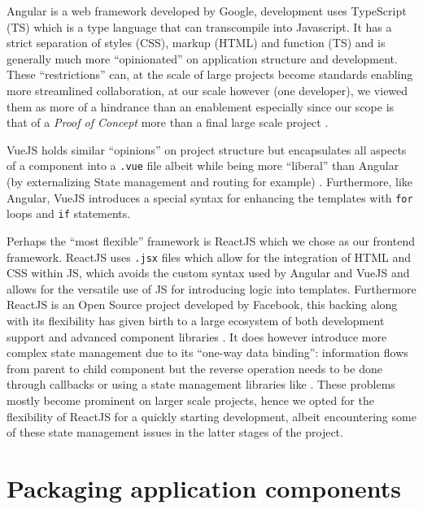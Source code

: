 \documentclass[\version]{l4proj}
\begin{document}
Angular is a web framework developed by Google, development uses TypeScript (TS) which is a type language that can transcompile into Javascript.
It has a strict separation of styles (CSS), markup (HTML) and function (TS) and is generally much more ``opinionated'' on application structure and development.
These ``restrictions'' can, at the scale of large projects become standards enabling more streamlined collaboration, at our scale however (one developer), we viewed them as more of a hindrance than an enablement especially since our scope is that of a \textit{Proof of Concept} more than a final large scale project \autocite{wohlgethanSupportingWebDevelopmentDecisions2018}.

VueJS holds similar ``opinions'' on project structure but encapsulates all aspects of a component into a \lstinline{.vue} file albeit while being more ``liberal'' than Angular (by externalizing State management and routing for example) \autocite{wohlgethanSupportingWebDevelopmentDecisions2018}.
Furthermore, like Angular, VueJS introduces a special syntax for enhancing the templates with \lstinline{for} loops and \lstinline{if} statements.

Perhaps the ``most flexible'' framework is ReactJS which we chose as our frontend framework.
ReactJS uses \lstinline{.jsx} files which allow for the integration of HTML and CSS within JS, which avoids the custom syntax used by Angular and VueJS and allows for the versatile use of JS for introducing logic into templates.
Furthermore ReactJS is an Open Source project developed by Facebook, this backing along with its flexibility has given birth to a large ecosystem of both development support and advanced component libraries \autocite{wohlgethanSupportingWebDevelopmentDecisions2018}.
It does however introduce more complex state management due to its ``one-way data binding'': information flows from parent to child component but the reverse operation needs to be done through callbacks or using a state management libraries like \textcite{Redux2020}.
These problems mostly become prominent on larger scale projects, hence we opted for the flexibility of ReactJS for a quickly starting development, albeit encountering some of these state management issues in the latter stages of the project.

\section{Packaging application components}
\end{document}
